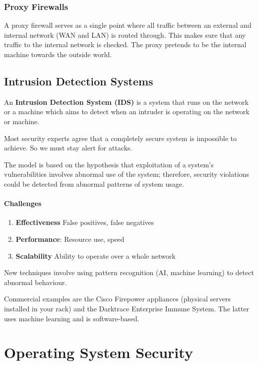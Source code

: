 \subsubsection{Proxy Firewalls}

A proxy firewall serves as a single point where all traffic between an external and internal network (WAN and LAN) is routed through. This makes sure that any traffic to the internal network is checked. The proxy pretends to be the internal machine towards the outside world.

\subsection{Intrusion Detection Systems}

An \textbf{Intrusion Detection System (IDS)} is a system that runs on the network or a machine which aims to detect when an intruder is operating on the network or machine. 

Most security experts agree that a completely secure system is impossible to achieve. So we must stay alert for attacks.

The model is based on the hypothesis that exploitation of a system's vulnerabilities involves abnormal use of the system; therefore, security violations could be detected from abnormal patterns of system usage.

\paragraph{Challenges}

\begin{enumerate}
    \item \textbf{Effectiveness} False positives, false negatives
    \item \textbf{Performance}: Resource use, speed
    \item \textbf{Scalability} Ability to operate over a whole network
\end{enumerate}

New techniques involve using pattern recognition (AI, machine learning) to detect abnormal behaviour.

Commercial examples are the Cisco Firepower appliances (physical servers installed in your rack) and the Darktrace Enterprise Immune System. The latter uses machine learning and is software-based.

\section{Operating System Security}

